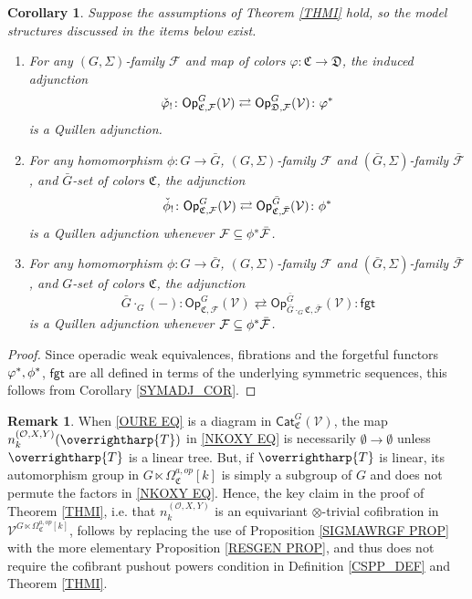\documentclass[a4paper,10pt
]{article}%
\numberwithin{equation}{section}
\numberwithin{figure}{section}
\newtheorem{corollary}[equation]{Corollary}%
\theoremstyle{definition} %
\newtheorem{remark}[equation]{Remark}%
\newcommand{\vect}[1]{\text{\overrightharp{\ensuremath{#1}}}}
\newcommand{\F}{\ensuremath{\mathcal F}}
\newcommand{\V}{\ensuremath{\mathcal V}}
\newcommand{\1}{\ensuremath{\mathbbm 1}}%
\begin{document}
\begin{corollary}\label{OPADJ_COR}
        Suppose the assumptions of Theorem \ref{THMI} hold, so the model structures discussed in the items below exist.
	\begin{enumerate}[label=(\roman*)]
		\item \label{OPCOCHADJ_LBL}
		For any $(G,\Sigma)$-family $\F$ and map of colors 
		$\varphi \colon \mathfrak C \to \mathfrak D$, the induced adjunction
		\[
		\check{\varphi}_! \colon \mathsf{Op}^G_{\mathfrak{C},\F}(\V)
		\rightleftarrows
		\mathsf{Op}^G_{\mathfrak{D},\F}(\V) \colon \varphi^{\**}
		\]
		is a Quillen adjunction.
		\item \label{OPFIXSETCHGR_LBL}
		For any homomorphism $\phi \colon G \to \bar G$,
		$(G,\Sigma)$-family $\F$ and $(\bar G,\Sigma)$-family $\bar{\F}$,
		and $\bar G$-set of colors $\mathfrak C$,
		the adjunction
		\[
		\check{\phi}_! \colon \mathsf{Op}^G_{\mathfrak{C},\F}(\V)
		\rightleftarrows
		\mathsf{Op}^{\bar{G}}_{\mathfrak{C},\bar{\F}}(\V) \colon \phi^{\**}
		\]
		is a Quillen adjunction whenever $\F \subseteq \phi^{\**} \bar{\F}$.
		\item \label{OPCOMBADJ_LBL}
		For any homomorphism $\phi \colon G \to \bar G$,
		$(G,\Sigma)$-family $\F$ and $(\bar G,\Sigma)$-family $\bar{\F}$,
		and $G$-set of colors $\mathfrak C$,
		the adjunction
		\[
		\bar{G} \cdot_G (-) \colon \mathsf{Op}^G_{\mathfrak{C},\F}(\V)
		\rightleftarrows
		\mathsf{Op}^{\bar{G}}_{\bar{G} \cdot_G \mathfrak{C},\bar{\F}}(\V) \colon \mathsf{fgt}
		\]
		is a Quillen adjunction whenever $\F \subseteq \phi^{\**} \bar{\F}$.
	\end{enumerate}
\end{corollary}

\begin{proof}
	Since operadic weak equivalences, fibrations and the forgetful functors $\varphi^{\**},\phi^{\**}$, $\mathsf{fgt}$
	are all defined in terms of the underlying symmetric sequences,
	this follows from Corollary \ref{SYMADJ_COR}.
\end{proof}






\begin{remark}\label{CSPNTHI REM}
	When \eqref{OURE EQ}
	is a diagram in $\mathsf{Cat}^G_{\mathfrak{C}}(\V)$, 
	the map 
	$n_k^{(\mathcal{O},X,Y)}(\vect{T})$
	in \eqref{NKOXY EQ}
	is necessarily $\emptyset \to \emptyset$
	unless $\vect{T}$ is a linear tree.
	But, if $\vect{T}$ is linear,
	its automorphism group in 
	$G \ltimes \Omega_{\mathfrak{C}}^{a,op}[k]$
	is simply a subgroup of $G$
	and does not permute the factors in \eqref{NKOXY EQ}.
	Hence, the key claim in the proof of Theorem \ref{THMI},
	i.e. that 
	$n_k^{(\mathcal{O},X,Y)}$
	is an equivariant $\otimes$-trivial cofibration in
	$\V^{G \ltimes \Omega_{\mathfrak{C}}^{a,op}[k]}$,
	follows by replacing the use of Proposition \ref{SIGMAWRGF PROP}
	with the more elementary
	Proposition \ref{RESGEN PROP},
	and thus does not require
	the cofibrant pushout powers condition
	in Definition \ref{CSPP_DEF} and Theorem \ref{THMI}.
\end{remark}
\end{document}
